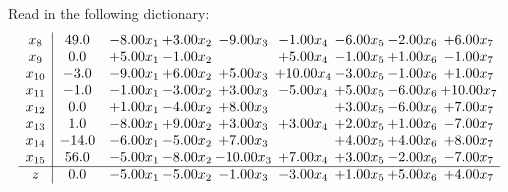 \documentclass[9pt]{article}
\begin{document}
Read in the following dictionary:
\[\begin{array}{c| c c@{\hskip 2pt} c@{\hskip 2pt} c@{\hskip 2pt} c@{\hskip 2pt} c@{\hskip 2pt} c@{\hskip 2pt} c@{\hskip 2pt} }
 x_{8}   &  49.0 & -8.00 x_{1} & +  3.00 x_{2} & -9.00 x_{3} & -1.00 x_{4} & -6.00 x_{5} & -2.00 x_{6} & +  6.00 x_{7}\\
 x_{9}   &  0.0 & +  5.00 x_{1} & -1.00 x_{2} &   & +  5.00 x_{4} & -1.00 x_{5} & +  1.00 x_{6} & -1.00 x_{7}\\
 x_{10}   &  -3.0 & -9.00 x_{1} & +  6.00 x_{2} & +  5.00 x_{3} & + 10.00 x_{4} & -3.00 x_{5} & -1.00 x_{6} & +  1.00 x_{7}\\
 x_{11}   &  -1.0 & -1.00 x_{1} & -3.00 x_{2} & +  3.00 x_{3} & -5.00 x_{4} & +  5.00 x_{5} & -6.00 x_{6} & + 10.00 x_{7}\\
 x_{12}   &  0.0 & +  1.00 x_{1} & -4.00 x_{2} & +  8.00 x_{3} &   & +  3.00 x_{5} & -6.00 x_{6} & +  7.00 x_{7}\\
 x_{13}   &  1.0 & -8.00 x_{1} & +  9.00 x_{2} & +  3.00 x_{3} & +  3.00 x_{4} & +  2.00 x_{5} & +  1.00 x_{6} & -7.00 x_{7}\\
 x_{14}   &  -14.0 & -6.00 x_{1} & -5.00 x_{2} & +  7.00 x_{3} &   & +  4.00 x_{5} & +  4.00 x_{6} & +  8.00 x_{7}\\
 x_{15}   &  56.0 & -5.00 x_{1} & -8.00 x_{2} & -10.00 x_{3} & +  7.00 x_{4} & +  3.00 x_{5} & -2.00 x_{6} & -7.00 x_{7}\\
\hline
z    &  0.0 & -5.00 x_{1} & -5.00 x_{2} & -1.00 x_{3} & -3.00 x_{4} & +  1.00 x_{5} & +  5.00 x_{6} & +  4.00 x_{7}\\
\end{array}\]
\end{document}
